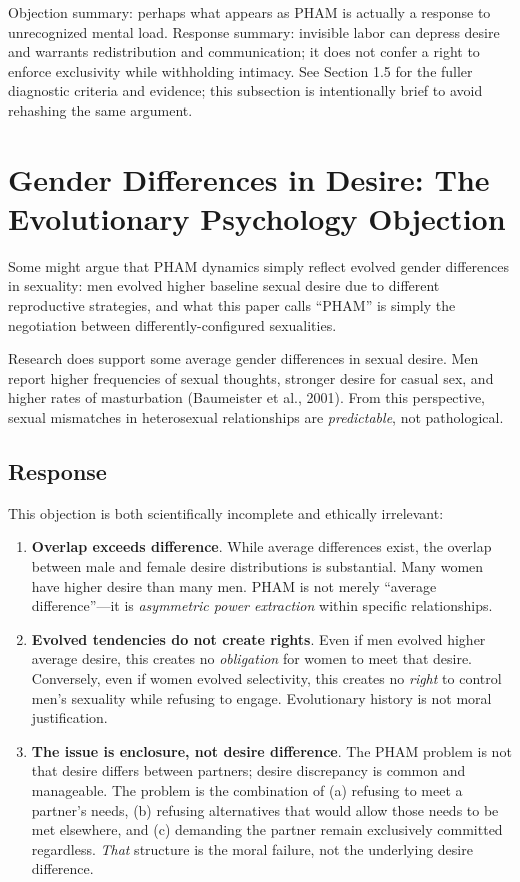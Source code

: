 \documentclass[12pt,openany]{book}
\numberwithin{equation}{chapter}
\begin{document}
Objection summary: perhaps what appears as PHAM is actually a response to unrecognized mental load. Response summary: invisible labor can depress desire and warrants redistribution and communication; it does not confer a right to enforce exclusivity while withholding intimacy. See Section 1.5 for the fuller diagnostic criteria and evidence; this subsection is intentionally brief to avoid rehashing the same argument.

\section{Gender Differences in Desire: The Evolutionary Psychology Objection}

Some might argue that PHAM dynamics simply reflect evolved gender differences in sexuality: men evolved higher baseline sexual desire due to different reproductive strategies, and what this paper calls ``PHAM'' is simply the negotiation between differently-configured sexualities.

Research does support some average gender differences in sexual desire. Men report higher frequencies of sexual thoughts, stronger desire for casual sex, and higher rates of masturbation (Baumeister et al., 2001). From this perspective, sexual mismatches in heterosexual relationships are \textit{predictable}, not pathological.

\subsection{Response}

This objection is both scientifically incomplete and ethically irrelevant:

\begin{enumerate}
    \item \textbf{Overlap exceeds difference}. While average differences exist, the overlap between male and female desire distributions is substantial. Many women have higher desire than many men. PHAM is not merely ``average difference''---it is \textit{asymmetric power extraction} within specific relationships.
    
    \item \textbf{Evolved tendencies do not create rights}. Even if men evolved higher average desire, this creates no \textit{obligation} for women to meet that desire. Conversely, even if women evolved selectivity, this creates no \textit{right} to control men's sexuality while refusing to engage. Evolutionary history is not moral justification.
    
    \item \textbf{The issue is enclosure, not desire difference}. The PHAM problem is not that desire differs between partners; desire discrepancy is common and manageable. The problem is the combination of (a) refusing to meet a partner's needs, (b) refusing alternatives that would allow those needs to be met elsewhere, and (c) demanding the partner remain exclusively committed regardless. \textit{That} structure is the moral failure, not the underlying desire difference.
\end{enumerate}
\end{document}
